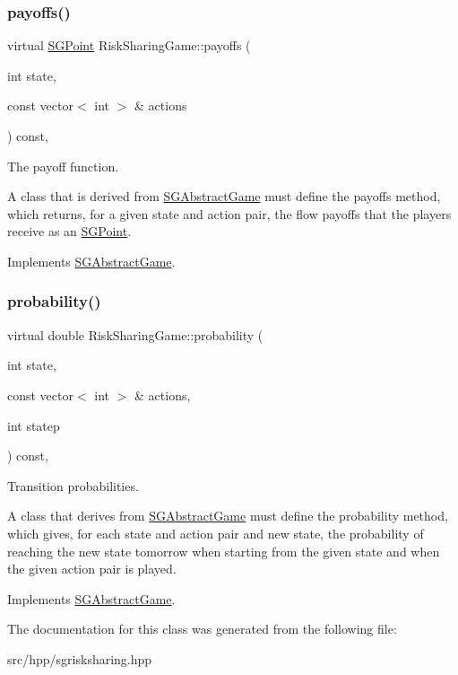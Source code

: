 \subsubsection{\texorpdfstring{payoffs()}{payoffs()}}
{\footnotesize\ttfamily virtual \hyperlink{classSGPoint}{S\+G\+Point} Risk\+Sharing\+Game\+::payoffs (\begin{DoxyParamCaption}\item[{int}]{state,  }\item[{const vector$<$ int $>$ \&}]{actions }\end{DoxyParamCaption}) const\hspace{0.3cm}{\ttfamily [inline]}, {\ttfamily [virtual]}}



The payoff function. 

A class that is derived from \hyperlink{classSGAbstractGame}{S\+G\+Abstract\+Game} must define the payoffs method, which returns, for a given state and action pair, the flow payoffs that the players receive as an \hyperlink{classSGPoint}{S\+G\+Point}. 

Implements \hyperlink{classSGAbstractGame_a3fc1cd009d1813f44f1f219e7deb6eef}{S\+G\+Abstract\+Game}.

\mbox{\label{classRiskSharingGame_aa9ae41ec3aec3342ffd2d16187746718}} 
\subsubsection{\texorpdfstring{probability()}{probability()}}
{\footnotesize\ttfamily virtual double Risk\+Sharing\+Game\+::probability (\begin{DoxyParamCaption}\item[{int}]{state,  }\item[{const vector$<$ int $>$ \&}]{actions,  }\item[{int}]{statep }\end{DoxyParamCaption}) const\hspace{0.3cm}{\ttfamily [inline]}, {\ttfamily [virtual]}}



Transition probabilities. 

A class that derives from \hyperlink{classSGAbstractGame}{S\+G\+Abstract\+Game} must define the probability method, which gives, for each state and action pair and new state, the probability of reaching the new state tomorrow when starting from the given state and when the given action pair is played. 

Implements \hyperlink{classSGAbstractGame_a416b31d5020b75de49447ce4f7783b98}{S\+G\+Abstract\+Game}.



The documentation for this class was generated from the following file\+:\begin{DoxyCompactItemize}
\item 
src/hpp/sgrisksharing.\+hpp\end{DoxyCompactItemize}
